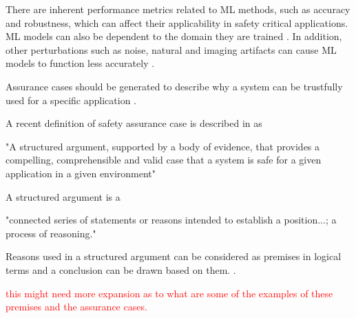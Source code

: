 
There are inherent performance metrics related to ML methods, such as accuracy and robustness, which can affect their applicability in safety critical applications. ML models can also be dependent to the domain they are trained \cite{Ganin2015}. In addition, other perturbations such as noise, natural and imaging artifacts can cause ML models to function less accurately \cite{Hendrycks2019}.

Assurance cases should be generated to describe why a system can be trustfully used for a specific application \cite{Ashmore2021}.

A recent definition of safety assurance case is described in \cite{Bloomfield2010} as


\begin{displayquote}[][]
"A structured argument, supported by a body of evidence, that provides a compelling, comprehensible and valid case that a system is safe for a given application in a given environment"
\end{displayquote}


A structured argument is a \cite{Omg2010}
\begin{displayquote}[][]
"connected series of statements or reasons intended to establish a position...; a process of reasoning."
\end{displayquote}

Reasons used in a structured argument can be considered as premises in logical terms and a conclusion can be drawn based on them. \cite{Omg2010}. 

\textcolor{red}{this might need more expansion as to what are some of the examples of these premises and the assurance cases.}

